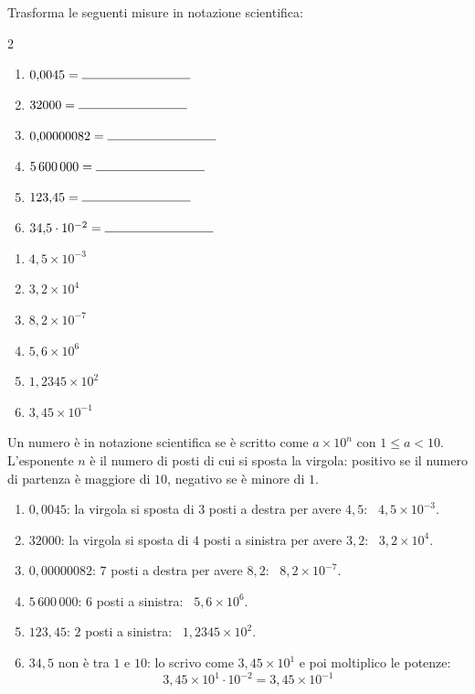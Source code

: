 \begin{question}[ID=3.1, subtitle={Conversione in notazione scientifica}, tags={notazione scientifica}, difficulty=facile]
Trasforma le seguenti misure in notazione scientifica:
\begin{center}\begin{minipage}{0.92\linewidth}
\begin{multicols}{2}
\begin{enumerate}
\item $0{,}0045 = \rule{3cm}{0.4pt}$
\item $32000 = \rule{3cm}{0.4pt}$
\item $0{,}00000082 = \rule{3cm}{0.4pt}$
\item $5\,600\,000 = \rule{3cm}{0.4pt}$
\item $123{,}45 = \rule{3cm}{0.4pt}$
\item $34{,}5 \cdot 10^{-2} = \rule{3cm}{0.4pt}$
\end{enumerate}
\end{multicols}
\end{minipage}\end{center}
\begin{solution}
\begin{enumerate}
    \item $4{,}5\times10^{-3}$
    \item $3{,}2\times10^{4}$
    \item $8{,}2\times10^{-7}$
    \item $5{,}6\times10^{6}$
    \item $1{,}2345\times10^{2}$
    \item $3{,}45\times10^{-1}$
\end{enumerate}
\end{solution}
\begin{explanation}
Un numero è in notazione scientifica se è scritto come $a\times10^n$ con $1\leq a<10$. L'esponente $n$ è il numero di posti di cui si sposta la virgola: positivo se il numero di partenza è maggiore di $10$, negativo se è minore di $1$.
\begin{enumerate}
    \item $0{,}0045$: la virgola si sposta di $3$ posti a destra per avere $4{,}5$: \ $4{,}5\times10^{-3}$.
    \item $32000$: la virgola si sposta di $4$ posti a sinistra per avere $3{,}2$: \ $3{,}2\times10^{4}$.
    \item $0{,}00000082$: $7$ posti a destra per avere $8{,}2$: \ $8{,}2\times10^{-7}$.
    \item $5\,600\,000$: $6$ posti a sinistra: \ $5{,}6\times10^{6}$.
    \item $123{,}45$: $2$ posti a sinistra: \ $1{,}2345\times10^{2}$.
    \item $34{,}5$ non è tra $1$ e $10$: lo scrivo come $3{,}45\times10^1$ e poi moltiplico le potenze:
    \[ 3{,}45\times10^{1}\cdot10^{-2}=3{,}45\times10^{-1} \]
\end{enumerate}
\end{explanation}
\end{question}
